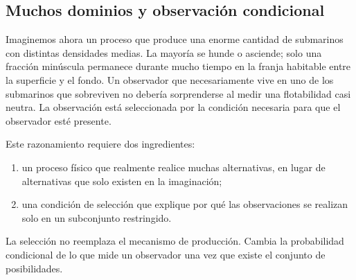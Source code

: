 \begin{classroomqa}
\end{classroomqa}

\subsection{Muchos dominios y observación condicional}

Imaginemos ahora un proceso que produce una enorme cantidad de submarinos con distintas densidades medias. La mayoría se hunde o asciende; solo una fracción minúscula permanece durante mucho tiempo en la franja habitable entre la superficie y el fondo. Un observador que necesariamente vive en uno de los submarinos que sobreviven no debería sorprenderse al medir una flotabilidad casi neutra. La observación está seleccionada por la condición necesaria para que el observador esté presente.

Este razonamiento requiere dos ingredientes:
\begin{enumerate}
\item un proceso físico que realmente realice muchas alternativas, en lugar de alternativas que solo existen en la imaginación;
\item una condición de selección que explique por qué las observaciones se realizan solo en un subconjunto restringido.
\end{enumerate}
La selección no reemplaza el mecanismo de producción. Cambia la probabilidad condicional de lo que mide un observador una vez que existe el conjunto de posibilidades.

\begin{classroomqa}
\end{classroomqa}

